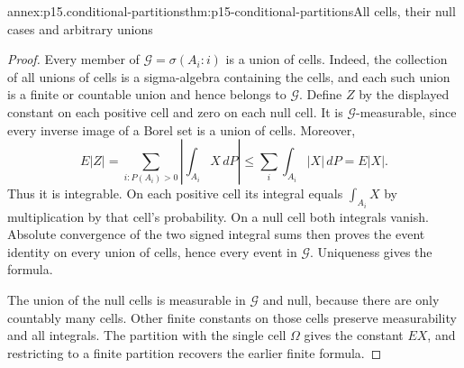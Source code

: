 \begin{annexitem}{annex:p15.conditional-partitions}{thm:p15-conditional-partitions}{All cells, their null cases and arbitrary unions}
\begin{proof}
Every member of \(\mathcal G=\sigma(A_i:i)\) is a union of cells.
Indeed, the collection of all unions of cells is a sigma-algebra
containing the cells, and each such union is a finite or countable
union and hence belongs to \(\mathcal G\).
Define \(Z\) by the displayed constant on each positive cell and
zero on each null cell. It is \(\mathcal G\)-measurable, since
every inverse image of a Borel set is a union of cells.
Moreover,
\[
             E|Z|
                =\sum_{i:P(A_i)>0}\left|\int_{A_i}X\,dP\right|
                \leq\sum_i\int_{A_i}|X|\,dP=E|X|.
\]
Thus it is integrable. On each positive cell its integral equals
\(\int_{A_i}X\) by multiplication by that cell's probability.
On a null cell both integrals vanish.
Absolute convergence of the two signed integral sums then proves
the event identity on every union of cells, hence every event in
\(\mathcal G\). Uniqueness gives the formula.

The union of the null cells is measurable in \(\mathcal G\)
and null, because there are only countably many cells.
Other finite constants on those cells preserve measurability and
all integrals. The partition with the single cell \(\Omega\)
gives the constant \(EX\), and restricting to a finite partition
recovers the earlier finite formula.
\end{proof}
\end{annexitem}

